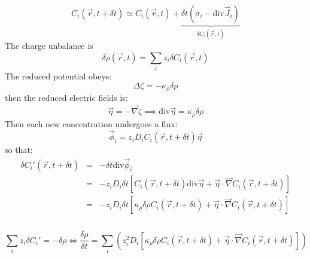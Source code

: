 \documentclass[aps,12pt]{revtex4}
\begin{document}
\begin{equation}
C_i(\vec{r},t+\delta t) \simeq C_i(\vec{r},t) + \underbrace{\delta t \left( \sigma_i - \mathrm{div}\vec{J}_i\right)}_{\delta C_i(\vec{r},t)}
\end{equation}
The charge unbalance is
\begin{equation}
	\delta \rho(\vec{r},t) = \sum_i z_i \delta C_i(\vec{r},t)
\end{equation}
The reduced potential obeys:
\begin{equation}
	\Delta \zeta = -\kappa_\rho \delta \rho
\end{equation}
then the reduced electric fields is:
\begin{equation}
	\vec{\eta} = - \vec{\nabla}{\zeta} \implies \mathrm{div} \vec\eta = \kappa_\rho \delta \rho
\end{equation}
 Then each new concentration undergoes a flux:
 \begin{equation}
 \vec{\phi}_i = z_i D_i C_i(\vec{r},t+\delta t)  \vec{\eta}
 \end{equation}
 so that:
 \begin{equation}
 \begin{array}{rcl}
 	\delta C_i'(\vec{r},t+\delta t) & =& - \delta t \mathrm{div} \vec\phi_i\\
	 & = & -z_i D_i \delta t \left[ C_i(\vec{r},t+\delta t) \mathrm{div} \vec\eta + \vec\eta \cdot \vec\nabla C_i(\vec{r},t+\delta t) \right]\\
	 & = & -z_i D_i \delta t \left[ \kappa_\rho \delta \rho C_i(\vec{r},t+\delta t)   + \vec\eta \cdot \vec\nabla C_i(\vec{r},t+\delta t) \right]\\\\
\end{array}
 \end{equation}
 
 \begin{equation}
 	\sum_i z_i \delta C_i ' = - \delta \rho \iff \dfrac{\delta\rho}{\delta t} = \sum_i \left( z_i^2 D_i \left[ \kappa_\rho \delta \rho C_i(\vec{r},t+\delta t)   + \vec\eta \cdot \vec\nabla C_i(\vec{r},t+\delta t) \right]\right)
 \end{equation}
 
\end{document}
